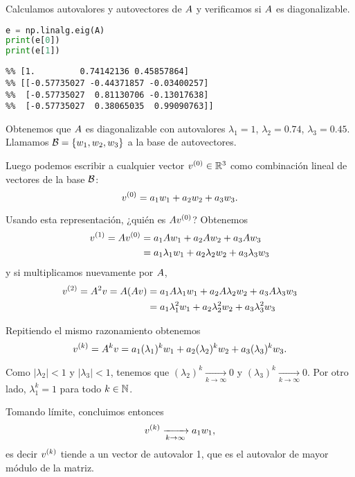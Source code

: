 Calculamos autovalores y autovectores de $\Ab$ y verificamos si $\Ab$ es diagonalizable.

\begin{Shaded}
\begin{lstlisting}[language=python]
e = np.linalg.eig(A)
print(e[0])
print(e[1])
\end{lstlisting}
\end{Shaded}

\begin{verbatim}
%% [1.         0.74142136 0.45857864]
%% [[-0.57735027 -0.44371857 -0.03400257]
%%  [-0.57735027  0.81130706 -0.13017638]
%%  [-0.57735027  0.38065035  0.99090763]]
\end{verbatim}

Obtenemos que $\Ab$ es diagonalizable con autovalores $\lambda_1 = 1$, $\lambda_2 = 0.74$, $\lambda_3 = 0.45$. Llamamos $\B = \{\wb_1, \wb_2, \wb_3\}$ a la base de autovectores.

Luego podemos escribir a cualquier vector  $\vb^{(0)} \in \R^3$ como combinación lineal de vectores de la base $\mathcal B$:
$$
\vb^{(0)} = a_1 \wb_1 + a_2 \wb_2 + a_3 \wb_3.
$$

Usando esta representación, ¿quién es $\Ab \vb^{(0)}$? Obtenemos
$$
\begin{aligned}
\vb^{(1)} = \Ab \vb^{(0)} &= a_1 \Ab \wb_1 + a_2 \Ab \wb_2 + a_3 \Ab \wb_3 \\
        &= a_1 \lambda_1 \wb_1 + a_2  \lambda_2  \wb_2 + a_3  \lambda_3 \wb_3
\end{aligned}
$$
y si multiplicamos nuevamente por $\Ab$,
$$
\begin{aligned}
\vb^{(2)} = \Ab^2 \vb = \Ab (\Ab \vb) &= a_1 \Ab \lambda_1 \wb_1 + a_2  \Ab \lambda_2  \wb_2 + a_3  \Ab \lambda_3 \wb_3\\
        &= a_1 \lambda_1^2 \wb_1 + a_2  \lambda_2^2  \wb_2 + a_3  \lambda_3^2 \wb_3
\end{aligned}
$$

Repitiendo el mismo razonamiento obtenemos
$$
\vb^{(k)} = \Ab^k \vb = a_1 (\lambda_1)^k \wb_1 + a_2 (\lambda_2)^k  \wb_2 + a_3 (\lambda_3)^k \wb_3.
$$

Como $|\lambda_2| < 1$ y $|\lambda_3|< 1$, tenemos que $(\lambda_2)^k \xrightarrow[k \rightarrow \infty]{} 0$ y $(\lambda_3)^k \xrightarrow[k \rightarrow \infty]{} 0$. Por otro lado, $\lambda_1^k = 1$ para todo $k \in \mathbb N$.

Tomando límite, concluimos entonces
$$
\vb^{(k)} \xrightarrow[k \rightarrow \infty]{} a_1 \wb_1,
$$
es decir $\vb^{(k)}$ tiende a un vector de autovalor 1, que es el autovalor de mayor módulo de la matriz.


